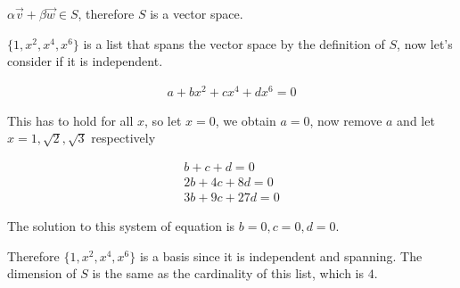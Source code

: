 \documentclass{article}
\begin{document}
$\alpha \vec{v} + \beta \vec{w} \in S$, therefore $S$ is a vector space.

$\{1, x^2, x^4, x^6\}$ is a list that spans the vector space by the definition of $S$, now let's consider if it is independent.

\begin{align*}
a + bx^2 + cx^4 + dx^6 = 0
\end{align*}

This has to hold for all $x$, so let $x = 0$, we obtain $a = 0$, now remove $a$ and let $x = 1, \sqrt{2}, \sqrt{3}$ respectively

\begin{align*}
b + c + d = 0 \\
2b + 4c + 8d = 0 \\
3b + 9c + 27d = 0
\end{align*}

The solution to this system of equation is $b = 0, c = 0, d = 0$.

Therefore $\{1, x^2, x^4, x^6\}$ is a basis since it is independent and spanning. The dimension of $S$ is the same as the cardinality of this list, which is $4$.
\end{document}
